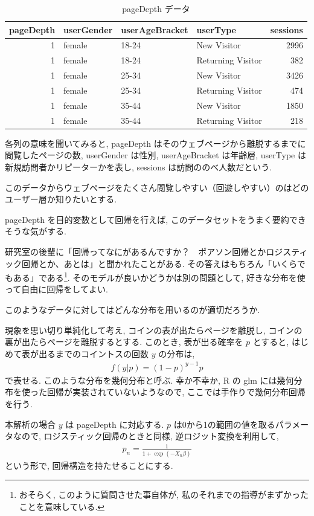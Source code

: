 \documentclass[a4paper, 12pt]{jarticle}
\begin{document}
\begin{table}[ht]
\centering
\caption{pageDepth データ}
\label{tabPageDepth}
\begin{tabular}{rlllr}
  \hline
 pageDepth & userGender & userAgeBracket & userType & sessions \\ 
  \hline
 1 & female & 18-24 & New Visitor & 2996 \\ 
 1 & female & 18-24 & Returning Visitor & 382 \\ 
 1 & female & 25-34 & New Visitor & 3426 \\ 
 1 & female & 25-34 & Returning Visitor & 474 \\ 
 1 & female & 35-44 & New Visitor & 1850 \\ 
 1 & female & 35-44 & Returning Visitor & 218 \\ 
   \hline
\end{tabular}
\end{table}

各列の意味を聞いてみると, pageDepth はそのウェブページから離脱するまでに閲覧したページの数, userGender は性別, userAgeBracket は年齢層, userType は新規訪問者かリピーターかを表し, sessions は訪問ののべ人数だという.

このデータからウェブページをたくさん閲覧しやすい（回遊しやすい）のはどのユーザー層か知りたいとする. 

pageDepth を目的変数として回帰を行えば, このデータセットをうまく要約できそうな気がする. 

研究室の後輩に「回帰ってなにがあるんですか？　ポアソン回帰とかロジスティック回帰とか、あとは」と聞かれたことがある. 
その答えはもちろん「いくらでもある」である\footnote{おそらく, このように質問させた事自体が, 私のそれまでの指導がまずかったことを意味している.}. そのモデルが良いかどうかは別の問題として, 好きな分布を使って自由に回帰をしてよい. 

このようなデータに対してはどんな分布を用いるのが適切だろうか.

現象を思い切り単純化して考え, コインの表が出たらページを離脱し, コインの裏が出たらページを離脱するとする. このとき, 表が出る確率を $p$ とすると, はじめて表が出るまでのコイントスの回数 $y$ の分布は, 
\begin{align}
f(y|p) = (1-p)^{y-1} p
\end{align}
で表せる. 
このような分布を幾何分布と呼ぶ. 
幸か不幸か, R の glm には幾何分布を使った回帰が実装されていないようなので, ここでは手作りで幾何分布回帰を行う. 

本解析の場合 $y$ は pageDepth に対応する. 
$p$ は0から1の範囲の値を取るパラメータなので, ロジスティック回帰のときと同様, 逆ロジット変換を利用して, 
\begin{align}
p_n = \frac{1}{1+\exp(-X_n \beta)}
\end{align}
という形で, 回帰構造を持たせることにする.
\end{document}
